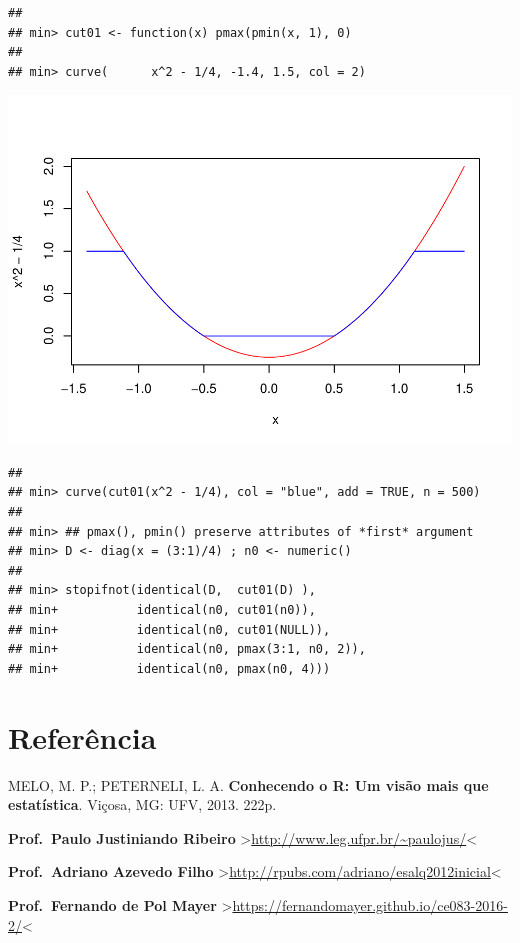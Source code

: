 \documentclass[
]{book}
\begin{document}
\begin{verbatim}
## 
## min> cut01 <- function(x) pmax(pmin(x, 1), 0)
## 
## min> curve(      x^2 - 1/4, -1.4, 1.5, col = 2)
\end{verbatim}

\includegraphics{TudodoR_files/figure-latex/unnamed-chunk-14-2.pdf}

\begin{verbatim}
## 
## min> curve(cut01(x^2 - 1/4), col = "blue", add = TRUE, n = 500)
## 
## min> ## pmax(), pmin() preserve attributes of *first* argument
## min> D <- diag(x = (3:1)/4) ; n0 <- numeric()
## 
## min> stopifnot(identical(D,  cut01(D) ),
## min+           identical(n0, cut01(n0)),
## min+           identical(n0, cut01(NULL)),
## min+           identical(n0, pmax(3:1, n0, 2)),
## min+           identical(n0, pmax(n0, 4)))
\end{verbatim}

\hypertarget{referuxeancia}{%
\section{Referência}\label{referuxeancia}}

MELO, M. P.; PETERNELI, L. A. \textbf{Conhecendo o R: Um visão mais que estatística}. Viçosa, MG: UFV, 2013. 222p.

\textbf{Prof.~Paulo Justiniando Ribeiro} \textgreater{}\url{http://www.leg.ufpr.br/~paulojus/}\textless{}

\textbf{Prof.~Adriano Azevedo Filho} \textgreater{}\url{http://rpubs.com/adriano/esalq2012inicial}\textless{}

\textbf{Prof.~Fernando de Pol Mayer} \textgreater{}\url{https://fernandomayer.github.io/ce083-2016-2/}\textless{}
\end{document}
